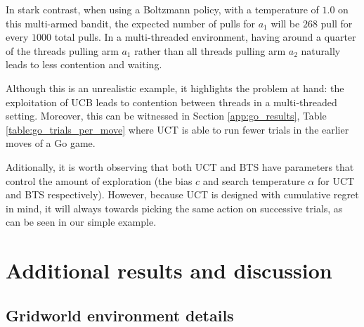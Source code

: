\documentclass{article}
\theoremstyle{plain}
\begin{document}
\begin{appendices}
	        In stark contrast, when using a Boltzmann policy, with a temperature of $1.0$ on this multi-armed bandit, the expected number of pulls for $a_1$ will be $268$ pull for every $1000$ total pulls. In a multi-threaded environment, having around a quarter of the threads pulling arm $a_1$ rather than all threads pulling arm $a_2$ naturally leads to less contention and waiting.
	
	        Although this is an unrealistic example, it highlights the problem at hand: the exploitation of UCB leads to contention between threads in a multi-threaded setting. Moreover, this can be witnessed in Section \ref{app:go_results}, Table \ref{table:go_trials_per_move} where UCT is able to run fewer trials in the earlier moves of a Go game.
	        
	        Aditionally, it is worth observing that both UCT and BTS have parameters that control the amount of exploration (the bias $c$ and search temperature $\alpha$ for UCT and BTS respectively). However, because UCT is designed with cumulative regret in mind, it will always towards picking the same action on successive trials, as can be seen in our simple example.
	













\newpage
\section{Additional results and discussion} \label{app:additional_results}

    \FloatBarrier
    




    \subsection{Gridworld environment details} \label{app:env_deets}
        

\end{appendices}
\end{document}
